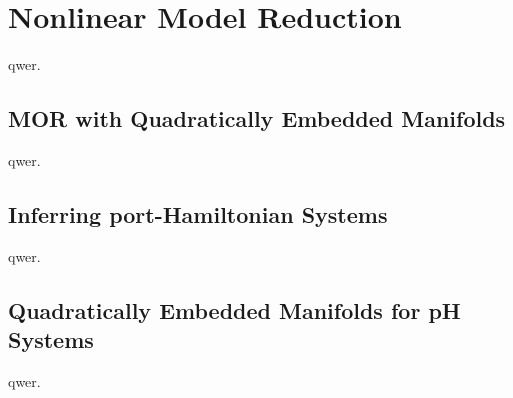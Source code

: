 \chapter{Nonlinear Model Reduction}\label{chap:nonlinear-mor}

qwer.

\section{MOR with Quadratically Embedded Manifolds}\label{sec:mor-quadratically-embedded-manifolds}

qwer.

\section{Inferring port-Hamiltonian Systems}\label{sec:inferring-ph-systems}

qwer.

\section{Quadratically Embedded Manifolds for pH Systems}\label{sec:quadratically-embedded-manifolds-ph-systems}

qwer.
